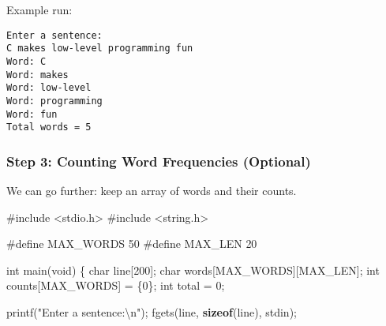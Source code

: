 \documentclass[
  letterpaper,
  DIV=11,
  numbers=noendperiod]{scrreprt}
\newenvironment{Shaded}{\begin{snugshade}}{\end{snugshade}}
\newcommand{\DataTypeTok}[1]{\textcolor[rgb]{0.68,0.00,0.00}{#1}}
\newcommand{\DecValTok}[1]{\textcolor[rgb]{0.68,0.00,0.00}{#1}}
\newcommand{\ImportTok}[1]{\textcolor[rgb]{0.00,0.46,0.62}{#1}}
\newcommand{\KeywordTok}[1]{\textcolor[rgb]{0.00,0.23,0.31}{\textbf{#1}}}
\newcommand{\NormalTok}[1]{\textcolor[rgb]{0.00,0.23,0.31}{#1}}
\newcommand{\OperatorTok}[1]{\textcolor[rgb]{0.37,0.37,0.37}{#1}}
\newcommand{\PreprocessorTok}[1]{\textcolor[rgb]{0.68,0.00,0.00}{#1}}
\newcommand{\SpecialCharTok}[1]{\textcolor[rgb]{0.37,0.37,0.37}{#1}}
\newcommand{\StringTok}[1]{\textcolor[rgb]{0.13,0.47,0.30}{#1}}
\begin{document}
Example run:

\begin{verbatim}
Enter a sentence:
C makes low-level programming fun
Word: C
Word: makes
Word: low-level
Word: programming
Word: fun
Total words = 5
\end{verbatim}

\subsubsection{Step 3: Counting Word Frequencies
(Optional)}\label{step-3-counting-word-frequencies-optional}

We can go further: keep an array of words and their counts.

\begin{Shaded}
\begin{Highlighting}[]
\PreprocessorTok{\#include }\ImportTok{\textless{}stdio.h\textgreater{}}
\PreprocessorTok{\#include }\ImportTok{\textless{}string.h\textgreater{}}

\PreprocessorTok{\#define MAX\_WORDS }\DecValTok{50}
\PreprocessorTok{\#define MAX\_LEN   }\DecValTok{20}

\DataTypeTok{int}\NormalTok{ main}\OperatorTok{(}\DataTypeTok{void}\OperatorTok{)} \OperatorTok{\{}
    \DataTypeTok{char}\NormalTok{ line}\OperatorTok{[}\DecValTok{200}\OperatorTok{];}
    \DataTypeTok{char}\NormalTok{ words}\OperatorTok{[}\NormalTok{MAX\_WORDS}\OperatorTok{][}\NormalTok{MAX\_LEN}\OperatorTok{];}
    \DataTypeTok{int}\NormalTok{ counts}\OperatorTok{[}\NormalTok{MAX\_WORDS}\OperatorTok{]} \OperatorTok{=} \OperatorTok{\{}\DecValTok{0}\OperatorTok{\};}
    \DataTypeTok{int}\NormalTok{ total }\OperatorTok{=} \DecValTok{0}\OperatorTok{;}

\NormalTok{    printf}\OperatorTok{(}\StringTok{"Enter a sentence:}\SpecialCharTok{\textbackslash{}n}\StringTok{"}\OperatorTok{);}
\NormalTok{    fgets}\OperatorTok{(}\NormalTok{line}\OperatorTok{,} \KeywordTok{sizeof}\OperatorTok{(}\NormalTok{line}\OperatorTok{),}\NormalTok{ stdin}\OperatorTok{);}


\end{Highlighting}
\end{Shaded}
\end{document}
